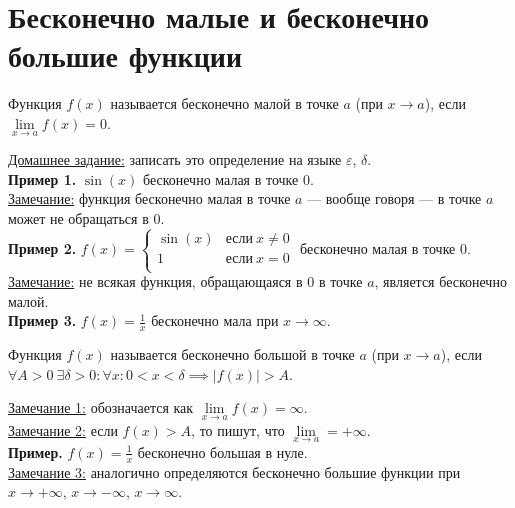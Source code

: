 \documentclass{article}
\begin{document}
    \section{Бесконечно малые и бесконечно большие функции}
    \begin{definition}
        Функция \(f(x)\) называется бесконечно малой в точке \(a\) (при \(x \to a\)), если \(\lim\limits_{x \to a}f(x) = 0\).
    \end{definition}
    \noindent
    \underline{Домашнее задание:} записать это определение на языке \(\varepsilon\), \(\delta\).\\
    \textbf{Пример 1.} \(\displaystyle \sin(x)\) бесконечно малая в точке \(0\).\\
    \underline{Замечание:} функция бесконечно малая в точке \(a\) --- вообще говоря --- в точке \(a\) может не обращаться в 0.\\
    \textbf{Пример 2.} \(\displaystyle f(x) =
    \begin{cases}
        \sin(x) & \text{если}\ x \neq 0\\
        1 & \text{если}\ x = 0\\ 
    \end{cases}\) бесконечно малая в точке 0.\\
    \underline{Замечание:} не всякая функция, обращающаяся в 0 в точке \(a\), является бесконечно малой.\\
    \textbf{Пример 3.} \(\displaystyle f(x) = \frac{1}{x}\) бесконечно мала при \(x \to \infty\).
    \begin{definition}
        Функция \(f(x)\) называется бесконечно большой в точке \(a\) (при \(x \to a\)), если \(\forall A > 0\ \exists \delta > 0: \forall x: 0 < x < \delta \implies |f(x)| > A\).  
    \end{definition}
    \noindent
    \underline{Замечание 1:} обозначается как \(\lim\limits_{x \to a}f(x) = \infty\).\\
    \underline{Замечание 2:} если \(f(x) > A\), то пишут, что \(\lim\limits_{x \to a} = +\infty\).\\
    \textbf{Пример.} \(\displaystyle f(x) = \frac{1}{x}\) бесконечно большая в нуле.\\
    \underline{Замечание 3:} аналогично определяются бесконечно большие функции при \(x \to +\infty\), \(x \to -\infty\), \(x \to \infty\).   
\end{document}
